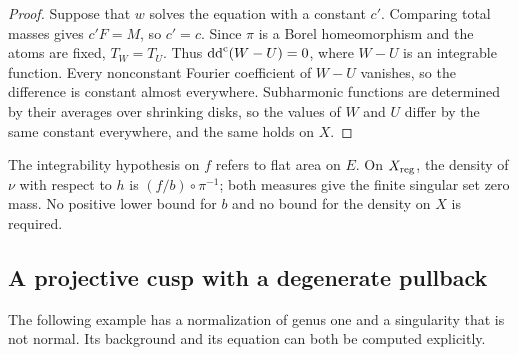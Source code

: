 \begin{proof}
Suppose that $w$ solves the equation with a constant $c'$. Comparing total masses gives $c'F=M$, so $c'=c$. Since $\pi$ is a Borel homeomorphism and the atoms are fixed, $T_W=T_U$. Thus $\mathrm{dd}^{\mathrm{c}}(W-U)=0$, where $W-U$ is an integrable function. Every nonconstant Fourier coefficient of $W-U$ vanishes, so the difference is constant almost everywhere. Subharmonic functions are determined by their averages over shrinking disks, so the values of $W$ and $U$ differ by the same constant everywhere, and the same holds on $X$.
\end{proof}

The integrability hypothesis on $f$ refers to flat area on $E$. On $X_{\rm reg}$, the density of $\nu$ with respect to $h$ is $(f/b)\circ\pi^{-1}$; both measures give the finite singular set zero mass. No positive lower bound for $b$ and no bound for the density on $X$ is required.

\subsection{A projective cusp with a degenerate pullback}
\label{subsec:unibranch-projective-cusp}

The following example has a normalization of genus one and a singularity that is not normal. Its background and its equation can both be computed explicitly.

